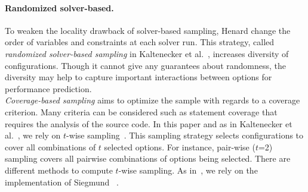 \paragraph{Randomized solver-based.} To weaken the locality drawback of solver-based sampling, Henard \etal change the order of variables and constraints at each solver run. This strategy, called \emph{randomized solver-based sampling} in Kaltenecker et al.~\cite{kaltenecker2019}, increases diversity of configurations. Though it cannot give any guarantees about randomness, the diversity may help to capture important interactions between options for performance prediction. \\[-7pt]




\textit{Coverage-based sampling} aims to optimize the sample with regards to a coverage criterion. Many criteria can be considered such as statement coverage that requires the analysis of the source code. In this paper and as in Kaltenecker et al.~\cite{kaltenecker2019}, we rely on $t$-wise sampling~\cite{Kuhn2004,Johansen2012,Cohen2008}. This sampling strategy selects configurations to cover all combinations of $t$ selected options.
For instance, pair-wise ($t$=2) sampling covers all pairwise
combinations of options being selected. There are different methods to compute $t$-wise sampling. As in~\cite{kaltenecker2019}, we rely on the implementation of Siegmund \etal~\cite{siegmund2012a}. 








